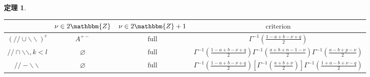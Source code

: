 \documentclass[12pt]{msjproc} %
\newcommand{\tmop}[1]{\ensuremath{\operatorname{#1}}}
\newtheorem{theorem}{定理}
\begin{document}
\begin{versiona}
\begin{theorem}
\begin{enumerate}
\begin{enumerate}
      \begin{center}
        \begin{center}
          \begin{center}
            \begin{center}
              \begin{tabular}{|c|c|c|c|}
                \hline
                & $\nu \in 2\mathbbm{Z}$ & $\nu \in 2\mathbbm{Z}+ 1$ &
                $\tmop{criterion}$\\
                \hline
                $(/ / \cup \backslash\backslash)^c$ & $A^{+ -}$ &
                $\tmop{full}$ & $\Gamma^{- 1} \left( \frac{1 - a + b - \nu +
                q}{2} \right)$\\
                \hline
                $/ / \cap \backslash\backslash, k < l$ & $\varnothing$ &
                $\tmop{full}$ & $\Gamma^{- 1} \left( \frac{1 - a + b - \nu +
                q}{2} \right) \Gamma^{- 1} \left( \frac{a + b + n - 1 -
                \nu}{2} \right) \Gamma^{- 1} \left( \frac{a - b + p - \nu}{2}
                \right)$\\
                \hline
                $/ / -\backslash\backslash$ & $\varnothing$ & $\tmop{full}$ &
                $\Gamma^{- 1} \left( \frac{1 - a + b - \nu + q}{2} \right)
                \left[ \Gamma^{- 1} \left( \frac{a + b + \nu}{2} \right)
                \right] \Gamma^{- 1} \left( \frac{1 + a - b + \nu - q}{2}
                \right)$\\
                \hline
              \end{tabular}
            \end{center}
          \end{center}
          
          \ 
        \end{center}
      \end{center}
      

\end{enumerate}
\end{enumerate}
\end{theorem}
\end{versiona}
\end{document}
